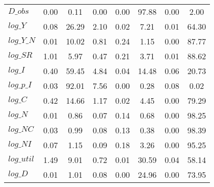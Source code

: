 \begin{center}
\begin{longtable}{lccccccc}
$D\_obs     $	 & 	        0.00	 & 	        0.11	 & 	        0.00	 & 	        0.00	 & 	       97.88	 & 	        0.00	 & 	        2.00 \\ 
$log\_Y     $	 & 	        0.08	 & 	       26.29	 & 	        2.10	 & 	        0.02	 & 	        7.21	 & 	        0.01	 & 	       64.30 \\ 
$log\_Y\_N  $	 & 	        0.01	 & 	       10.02	 & 	        0.81	 & 	        0.24	 & 	        1.15	 & 	        0.00	 & 	       87.77 \\ 
$log\_SR    $	 & 	        1.01	 & 	        5.97	 & 	        0.47	 & 	        0.21	 & 	        3.71	 & 	        0.01	 & 	       88.62 \\ 
$log\_I     $	 & 	        0.40	 & 	       59.45	 & 	        4.84	 & 	        0.04	 & 	       14.48	 & 	        0.06	 & 	       20.73 \\ 
$log\_p\_I  $	 & 	        0.03	 & 	       92.01	 & 	        7.56	 & 	        0.00	 & 	        0.28	 & 	        0.08	 & 	        0.02 \\ 
$log\_C     $	 & 	        0.42	 & 	       14.66	 & 	        1.17	 & 	        0.02	 & 	        4.45	 & 	        0.00	 & 	       79.29 \\ 
$log\_N     $	 & 	        0.01	 & 	        0.86	 & 	        0.07	 & 	        0.14	 & 	        0.68	 & 	        0.00	 & 	       98.25 \\ 
$log\_NC    $	 & 	        0.03	 & 	        0.99	 & 	        0.08	 & 	        0.13	 & 	        0.38	 & 	        0.00	 & 	       98.39 \\ 
$log\_NI    $	 & 	        0.07	 & 	        1.15	 & 	        0.09	 & 	        0.18	 & 	        3.26	 & 	        0.00	 & 	       95.25 \\ 
$log\_util  $	 & 	        1.49	 & 	        9.01	 & 	        0.72	 & 	        0.01	 & 	       30.59	 & 	        0.04	 & 	       58.14 \\ 
$log\_D     $	 & 	        0.01	 & 	        1.01	 & 	        0.08	 & 	        0.00	 & 	       24.96	 & 	        0.00	 & 	       73.95 \\ 
\end{longtable}
 \end{center}

